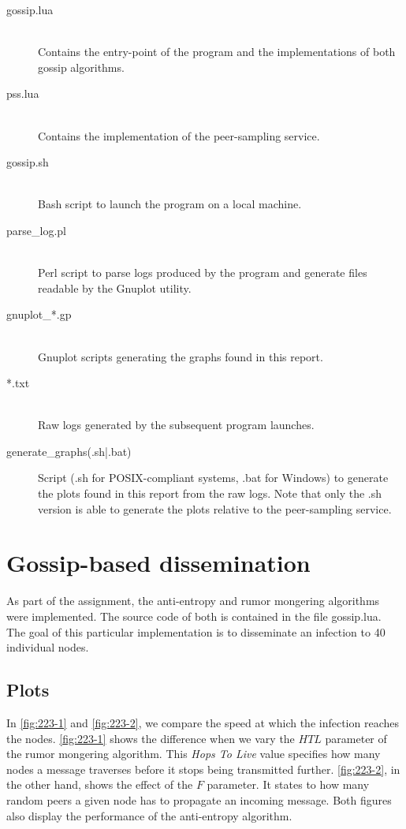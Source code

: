 \documentclass[11pt,a4paper]{scrartcl}
\begin{document}
\begin{description}
\item[gossip.lua]\hfill\\ Contains the entry-point of the program and the implementations of both gossip algorithms.
\item[pss.lua]\hfill\\ Contains the implementation of the peer-sampling service.
\item[gossip.sh]\hfill\\ Bash script to launch the program on a local machine.
\item[parse\_log.pl]\hfill\\ Perl script to parse logs produced by the program and generate files readable by the Gnuplot utility.
\item[gnuplot\_*.gp]\hfill\\ Gnuplot scripts generating the graphs found in this report.
\item[*.txt]\hfill\\ Raw logs generated by the subsequent program launches.
\item[generate\_graphs(.sh|.bat)] Script (\textsf{.sh} for POSIX-compliant systems, \textsf{.bat} for Windows) to generate the plots found in this report from the raw logs. Note that only the \textsf{.sh} version is able to generate the plots relative to the peer-sampling service.
\end{description}


\section{Gossip-based dissemination}

As part of the assignment, the anti-entropy and rumor mongering algorithms were implemented. The source code of both is contained in the file \textsf{gossip.lua}. The goal of this particular implementation is to disseminate an infection to 40 individual nodes.

\subsection{Plots}

In \autoref{fig:223-1} and \autoref{fig:223-2}, we compare the speed at which the infection reaches the nodes. \autoref{fig:223-1} shows the difference when we vary the $HTL$ parameter of the rumor mongering algorithm. This \textit{Hops To Live} value specifies how many nodes a message traverses before it stops being transmitted further. \autoref{fig:223-2}, in the other hand, shows the effect of the $F$ parameter. It states to how many random peers a given node has to propagate an incoming message. Both figures also display the performance of the anti-entropy algorithm.
\end{document}
